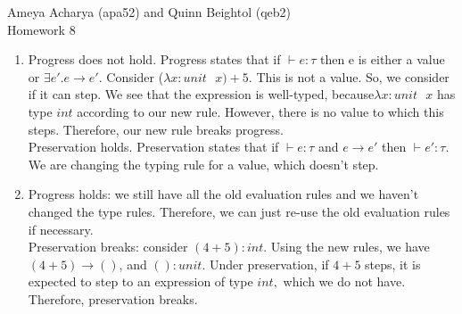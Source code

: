 \documentclass[10pt]{article}
\begin{document}
Ameya Acharya (apa52) and Quinn Beightol (qeb2)\\

Homework 8\\


\begin{exercise}
\begin{enumerate}
\item   Progress does not hold. Progress states that if $\vdash e: \tau$ then e is either a value or $\exists e'. e \rightarrow e'.$ Consider ($\lambda x: unit \text{ } x) + 5$. This is not a value. So, we consider if it can step. We see that the expression is well-typed, because$\lambda x: unit \text{ } x$ has type $int$ according to our new rule. However, there is no value to which this steps. Therefore, our new rule breaks progress. \\

Preservation holds. Preservation states that if $\vdash e: \tau$ and $e \rightarrow e'$ then $\vdash e': \tau$. We are changing the typing rule for a value, which doesn't step. 

\item  Progress holds: we still have all the old evaluation rules and we haven't changed the type rules. Therefore, we can just re-use the old evaluation rules if necessary.\\

Preservation breaks: consider $(4 + 5) : int$. Using the new rules, we have $(4 + 5) \rightarrow ()$, and $() : unit.$ Under preservation, if $4 + 5$ steps, it is expected to step to an expression of type $int,$ which we do not have. Therefore, preservation breaks.
 
\end{enumerate}
\end{exercise}
\end{document}
